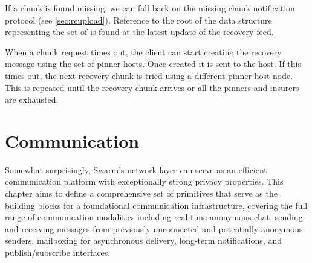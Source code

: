 If a chunk is found missing, we can fall back on the missing chunk notification protocol (see \ref{sec:reupload}). Reference to the root of the data structure representing the set of  is found at the latest update of the recovery feed. 

When a chunk request times out, the client can start creating the recovery message using the set of pinner hosts. Once created it is sent to the host. If this times out, the next recovery chunk is tried using a different pinner host node. This is repeated until the recovery chunk arrives or all the pinners and insurers are exhausted.



\section{Communication \statusred}\label{sec:messaging}


Somewhat surprisingly, Swarm's network layer can serve as  an efficient  communication platform with exceptionally strong privacy properties. This chapter aims to define a comprehensive set of primitives that serve as the building blocks for a foundational communication infrastructure, covering the full range of communication modalities including real-time anonymous chat, sending and receiving messages from previously  unconnected and potentially anonymous senders, mailboxing for asynchronous delivery, long-term notifications, and  publish/subscribe interfaces. 

